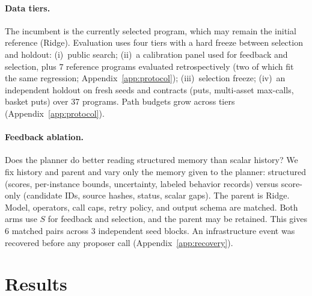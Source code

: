 \documentclass{article}
\begin{document}
\paragraph{Data tiers.}
The incumbent is the currently selected program, which may remain the initial reference (Ridge). Evaluation uses four tiers with a hard freeze between selection and holdout: (i)~public search; (ii)~a calibration panel used for feedback and selection, plus $7$ reference programs evaluated retrospectively (two of which fit the same regression; Appendix~\ref{app:protocol}); (iii)~selection freeze; (iv)~an independent holdout on fresh seeds and contracts (puts, multi-asset max-calls, basket puts) over 37 programs. Path budgets grow across tiers (Appendix~\ref{app:protocol}).

\paragraph{Feedback ablation.}
Does the planner do better reading structured memory than scalar history? We fix history and parent and vary only the memory given to the planner: structured (scores, per-instance bounds, uncertainty, labeled behavior records) versus score-only (candidate IDs, source hashes, status, scalar gaps). The parent is Ridge. Model, operators, call caps, retry policy, and output schema are matched. Both arms use $S$ for feedback and selection, and the parent may be retained. This gives 6 matched pairs across 3 independent seed blocks. An infrastructure event was recovered before any proposer call (Appendix~\ref{app:recovery}).

\section{Results}
\label{sec:results}
\end{document}
